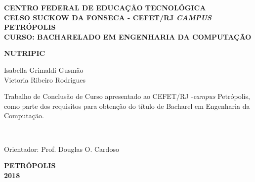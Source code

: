 \begin{center}
{\large \bf CENTRO FEDERAL DE EDUCAÇÃO TECNOLÓGICA} \vspace{1mm} \\
{\large \bf CELSO SUCKOW DA FONSECA - CEFET/RJ \textit{CAMPUS} PETRÓPOLIS} \vspace{1mm} \\
{\large \bf CURSO: BACHARELADO EM ENGENHARIA DA COMPUTAÇÃO}

\vspace*{3cm}
\normalsize{\large \bf NUTRIPIC}\\
\end{center}
\vspace{1.5cm}
\hfill
	\begin{flushright}
	Isabella Grimaldi Gusmão \\
	Victoria Ribeiro Rodrigues
	\end{flushright}
\vspace*{1.5cm}
\begin{flushright}
	\begin{minipage}{0.5\textwidth}
		{\normalsize
		Trabalho de Conclusão de Curso apresentado ao  
	 CEFET/RJ -{\it campus} Petrópolis, como parte dos requisitos para obtenção do título de Bacharel em Engenharia da Computação.}
	\end{minipage}\\[1.5cm]
\end{flushright}
\vspace{1.5cm}
\hfill
\begin{flushright}
Orientador: Prof. Douglas O. Cardoso
\end{flushright}




\vspace*{3.3cm}
\begin{center}
{\bf PETRÓPOLIS \\ 2018}\\
\end{center}



